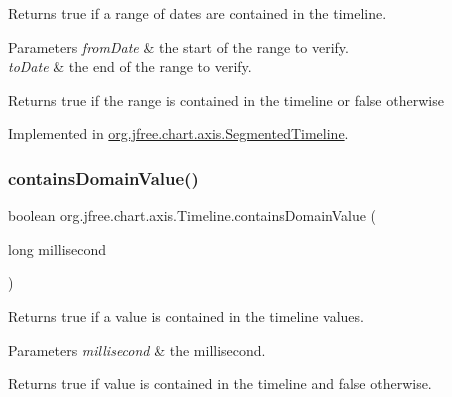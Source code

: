 Returns {\ttfamily true} if a range of dates are contained in the timeline.


\begin{DoxyParams}{Parameters}
{\em from\+Date} & the start of the range to verify. \\
\hline
{\em to\+Date} & the end of the range to verify.\\
\hline
\end{DoxyParams}
\begin{DoxyReturn}{Returns}
{\ttfamily true} if the range is contained in the timeline or {\ttfamily false} otherwise 
\end{DoxyReturn}


Implemented in \mbox{\hyperlink{classorg_1_1jfree_1_1chart_1_1axis_1_1_segmented_timeline_a71800b05e06d6011fcff21df388e1b63}{org.\+jfree.\+chart.\+axis.\+Segmented\+Timeline}}.

\mbox{\label{interfaceorg_1_1jfree_1_1chart_1_1axis_1_1_timeline_a2c56414de5571774ff54ad8c10702a87}} 
\subsubsection{\texorpdfstring{contains\+Domain\+Value()}{containsDomainValue()}\hspace{0.1cm}{\footnotesize\ttfamily [1/2]}}
{\footnotesize\ttfamily boolean org.\+jfree.\+chart.\+axis.\+Timeline.\+contains\+Domain\+Value (\begin{DoxyParamCaption}\item[{long}]{millisecond }\end{DoxyParamCaption})}

Returns {\ttfamily true} if a value is contained in the timeline values.


\begin{DoxyParams}{Parameters}
{\em millisecond} & the millisecond.\\
\hline
\end{DoxyParams}
\begin{DoxyReturn}{Returns}
{\ttfamily true} if value is contained in the timeline and {\ttfamily false} otherwise. 
\end{DoxyReturn}


